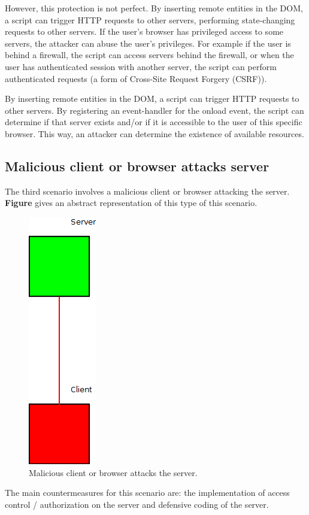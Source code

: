 However, this protection is not perfect. By inserting remote entities in the DOM, a script can trigger HTTP requests to other servers, performing state-changing requests to other servers. If the user's browser has privileged access to some servers, the attacker can abuse the user's privileges. For example if the user is behind a firewall, the script can access servers behind the firewall, or when the user has authenticated session with another server, the script can perform authenticated requests (a form of Cross-Site Request Forgery (CSRF)).

By inserting remote entities in the DOM, a script can trigger HTTP requests to other servers. By registering an event-handler for the onload event, the script can determine if that server exists and/or if it is accessible to the user of this specific browser. This way, an attacker can determine the existence of available resources.


\subsection{Malicious client or browser attacks server}

The third scenario involves a malicious client or browser attacking the server. \textbf{Figure} gives an abstract representation of this type of this scenario.

\begin{figure}[H]
	\begin{center}		
		\includegraphics[width=0.1\columnwidth]{img/security/threat-scenario-bad-browser-good-server}
		\caption{Malicious client or browser attacks the server.}
		\label{fig:threat-scenario:bad-browser-good-server}
	\end{center}
\end{figure}

The main countermeasures for this scenario are: the implementation of access control / authorization on the server and defensive coding of the server.

